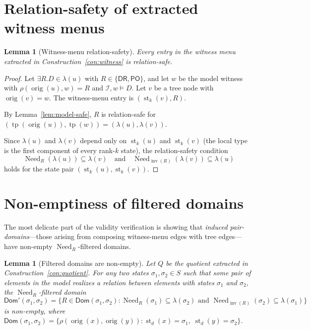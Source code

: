 \documentclass[11pt]{article}
\newtheorem{lemma}[theorem]{Lemma}
\theoremstyle{definition}
\theoremstyle{remark}
\newcommand{\DR}{\mathsf{DR}}
\newcommand{\PO}{\mathsf{PO}}
\newcommand{\tp}{\operatorname{tp}}
\newcommand{\st}{\operatorname{st}}
\newcommand{\inv}{\operatorname{inv}}
\newcommand{\orig}{\operatorname{orig}}
\newcommand{\Need}{\operatorname{Need}}
\newcommand{\Dom}{\mathsf{Dom}}
\begin{document}
\section{Relation-safety of extracted witness menus}
\label{sec:relation-safety}

\begin{lemma}[Witness-menu relation-safety]\label{lem:witness-safe}
Every entry in the witness menu extracted in
Construction~\ref{con:witness} is relation-safe.
\end{lemma}

\begin{proof}
Let $\exists R.D\in\lambda(u)$ with $R\in\{\DR,\PO\}$, and let
$w$ be the model witness with $\rho(\orig(u),w)=R$ and
$\mathcal{I},w\models D$.  Let $v$ be a tree node with
$\orig(v)=w$.  The witness-menu entry is $(\st_k(v), R)$.

By Lemma~\ref{lem:model-safe}, $R$ is relation-safe for
$(\tp(\orig(u)),\tp(w))=(\lambda(u),\lambda(v))$.

Since $\lambda(u)$ and $\lambda(v)$ depend only on
$\st_k(u)$ and $\st_k(v)$ (the local type is the first component
of every rank-$k$ state), the relation-safety condition
\[
\Need_R(\lambda(u))\subseteq\lambda(v)
\quad\text{and}\quad
\Need_{\inv(R)}(\lambda(v))\subseteq\lambda(u)
\]
holds for the state pair $(\st_k(u),\st_k(v))$.
\end{proof}


\section{Non-emptiness of filtered domains}
\label{sec:nonempty}

The most delicate part of the validity verification is showing that
\emph{induced pair-domains}---those arising from composing
witness-menu edges with tree edges---have non-empty
$\Need_R$-filtered domains.

\begin{lemma}[Filtered domains are non-empty]\label{lem:filtered}
Let $Q$ be the quotient extracted in Construction~\ref{con:quotient}.
For any two states $\sigma_1,\sigma_2\in S$ such that some pair of
elements in the model realizes a relation between elements with
states $\sigma_1$ and $\sigma_2$, the $\Need_R$-filtered domain
\[
\Dom'(\sigma_1,\sigma_2) = \{R\in\Dom(\sigma_1,\sigma_2) :
  \Need_R(\sigma_1)\subseteq\lambda(\sigma_2)\text{ and }
  \Need_{\inv(R)}(\sigma_2)\subseteq\lambda(\sigma_1)\}
\]
is non-empty, where
$\Dom(\sigma_1,\sigma_2)=\{\rho(\orig(x),\orig(y)):
\st_d(x)=\sigma_1,\;\st_d(y)=\sigma_2\}$.
\end{lemma}
\end{document}
